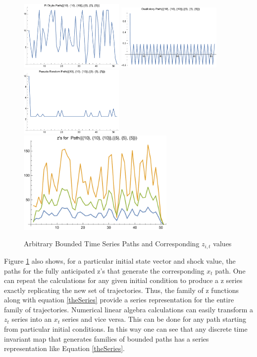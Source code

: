 \documentclass[12pt]{article}
\begin{document}
\begin{figure}
  \centering
\includegraphics[width=2in]{piPath.pdf}
\includegraphics[width=2in]{oscillPath.pdf}
\includegraphics[width=2in]{pseudoPath.pdf}
\includegraphics[width=3in]{theZs.pdf}  
  
  \caption{Arbitrary Bounded Time Series Paths and Corresponding $z_{i,t}$ values}\label{arbpaths}
\end{figure}





Figure \ref{arbpaths} also shows, for a particular initial state vector and shock value,  the paths for the  fully anticipated z's that generate the corresponding $x_t$ path.
One can repeat the calculations for any given initial condition to produce
a z series exactly replicating the new set of trajectories.  Thus, the family
of z functions along with equation \ref{theSeries} provide a series 
representation for the entire family of trajectories. Numerical linear algebra calculations can easily transform a $z_t$ series into an $x_t$ series and vice versa.  This can be done for any path starting from particular initial conditions.  In this way one can see that any discrete time invariant map that generates families of bounded paths has a series representation like Equation \ref{theSeries}.
\end{document}
